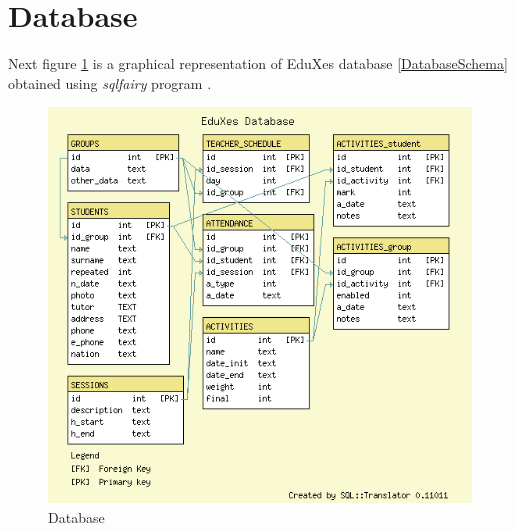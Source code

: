 \section{Database \label{DataBase}}
Next figure \ref{fig:Database} is a graphical representation of EduXes database \ref{DatabaseSchema} obtained using \textit{sqlfairy} program \cite{SQLFairy}.
\begin{figure}
    \begin{center}
        \includegraphics[width=\textwidth]{data_base.png}
        \caption{Database}
        \label{fig:Database}
    \end{center}
\end{figure}

